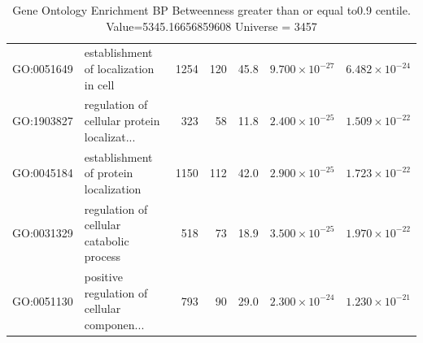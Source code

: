 \begin{table}[ht]
\begin{tabular}{llrrrrr}
  GO:0051649 & establishment of localization in cell & 1254 & 120 & 45.8 & $9.700 \times 10^{-27}$ & $6.482 \times 10^{-24}$ \\ 
  GO:1903827 & regulation of cellular protein localizat... & 323 & 58 & 11.8 & $2.400 \times 10^{-25}$ & $1.509 \times 10^{-22}$ \\ 
  GO:0045184 & establishment of protein localization & 1150 & 112 & 42.0 & $2.900 \times 10^{-25}$ & $1.723 \times 10^{-22}$ \\ 
  GO:0031329 & regulation of cellular catabolic process & 518 & 73 & 18.9 & $3.500 \times 10^{-25}$ & $1.970 \times 10^{-22}$ \\ 
  GO:0051130 & positive regulation of cellular componen... & 793 & 90 & 29.0 & $2.300 \times 10^{-24}$ & $1.230 \times 10^{-21}$ \\ 
   \hline
\end{tabular}
\caption{Gene Ontology Enrichment BP Betweenness  greater than or equal to0.9 centile.   Value=5345.16656859608 Universe = 3457} 
\label{tab:Gene Ontology Enrichment BP Betweenness  greater than or equal to0.9 centile.   Value=5345.16656859608 Universe = 3457}
\end{table}

